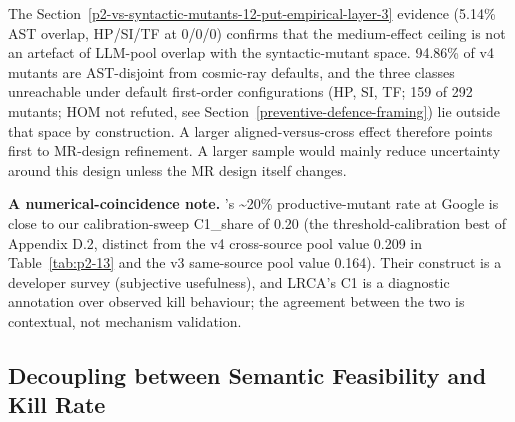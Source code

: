 \documentclass[manuscript,screen,review]{acmart}
\begin{document}
The Section~\ref{p2-vs-syntactic-mutants-12-put-empirical-layer-3} evidence (5.14\% AST overlap, HP/SI/TF at 0/0/0) confirms that
the medium-effect ceiling is not an artefact of LLM-pool overlap with
the syntactic-mutant space. 94.86\% of v4 mutants are AST-disjoint from
cosmic-ray defaults, and the three classes unreachable under default
first-order configurations (HP, SI, TF; 159 of 292 mutants; HOM not
refuted, see Section~\ref{preventive-defence-framing}) lie outside that space by construction. A
larger aligned-versus-cross effect therefore points first to MR-design
refinement. A larger sample would mainly reduce uncertainty around this
design unless the MR design itself changes.

\textbf{A numerical-coincidence note.} \citeauthor{petrovic2021improve}'s \citeyearpar{petrovic2021improve}
\textasciitilde20\% productive-mutant rate at Google is close to our
calibration-sweep C1\_share of 0.20 (the threshold-calibration best of
Appendix D.2, distinct from the v4 cross-source pool value 0.209 in
Table~\ref{tab:p2-13} and the v3 same-source pool value 0.164). Their
construct is a developer survey
(subjective usefulness), and LRCA's C1 is a diagnostic annotation over
observed kill behaviour; the agreement between the two is contextual,
not mechanism validation.

\subsection{Decoupling between Semantic Feasibility and Kill Rate}\label{decoupling-between-r_sem-and-r_kill}
\end{document}
